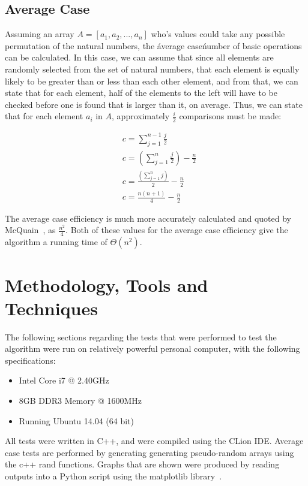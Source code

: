 \documentclass{article}
\begin{document}
    \subsection{Average Case}
        Assuming an array $A = [a_1, a_2, ..., a_n]$ who's values could take any possible permutation of the natural numbers, the \'average case\' number of basic operations can be calculated. In this case, we can assume that since all elements are randomly selected from the set of natural numbers, that each element is equally likely to be greater than or less than each other element, and from that, we can state that for each element, half of the elements to the left will have to be checked before one is found that is larger than it, on average. Thus, we can state that for each element $a_i$ in $A$, approximately $\frac{i}{2}$ comparisons must be made:

        \begin{align}
            & c = \sum_{j = 1}^{n - 1} \frac{j}{2} \\
            & c = (\sum_{j = 1}^{n} \frac{j}{2}) - \frac{n}{2}\\
            & c = \frac{(\sum_{j = 1}^{n} j)}{2} - \frac{n}{2}\\
            & c = \frac{n(n + 1)}{4} - \frac{n}{2}
        \end{align}

        The average case efficiency is much more accurately calculated and quoted by McQuain~\cite{McQuain2000}, as $\frac{n^2}{4}$. Both of these values for the average case efficiency give the algorithm a running time of $\Theta(n^2)$.

\section{Methodology, Tools and Techniques}
    The following sections regarding the tests that were performed to test the algorithm were run on relatively powerful personal computer, with the following specifications:
    \begin{itemize}
        \item Intel Core i7 @ 2.40GHz
        \item 8GB DDR3 Memory @ 1600MHz
        \item Running Ubuntu 14.04 (64 bit)
    \end{itemize}

    All tests were written in C++, and were compiled using the CLion IDE. Average case tests are performed by generating generating pseudo-random arrays using the c++ rand functions. Graphs that are shown were produced by reading outputs into a Python script using the matplotlib library~\cite{Hunter2007}.
\end{document}
